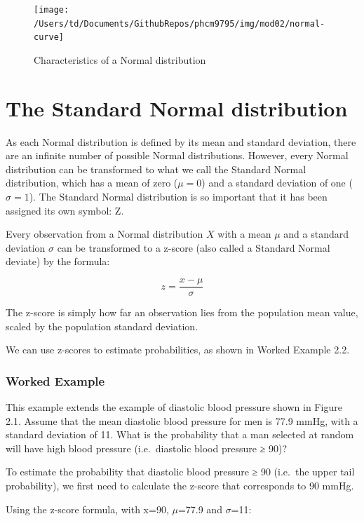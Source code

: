 \documentclass[
]{memoir}
\begin{document}
\begin{figure}
\texttt{[image: /Users/td/Documents/GithubRepos/phcm9795/img/mod02/normal-curve]} \caption{Characteristics of a Normal distribution}\label{fig:fig-2-3}
\end{figure}

\hypertarget{the-standard-normal-distribution}{%
\section{The Standard Normal distribution}\label{the-standard-normal-distribution}}

As each Normal distribution is defined by its mean and standard deviation, there are an infinite number of possible Normal distributions. However, every Normal distribution can be transformed to what we call the Standard Normal distribution, which has a mean of zero (\(\mu = 0\)) and a standard deviation of one (\(\sigma = 1\)). The Standard Normal distribution is so important that it has been assigned its own symbol: Z.

Every observation from a Normal distribution \(X\) with a mean \(\mu\) and a standard deviation \(\sigma\) can be transformed to a z-score (also called a Standard Normal deviate) by the formula:

\[ z = \frac{x - \mu}{\sigma} \]

The z-score is simply how far an observation lies from the population mean value, scaled by the population standard deviation.

We can use z-scores to estimate probabilities, as shown in Worked Example 2.2.

\hypertarget{worked-example-3}{%
\subsubsection{Worked Example}\label{worked-example-3}}

This example extends the example of diastolic blood pressure shown in Figure 2.1. Assume that the mean diastolic blood pressure for men is 77.9 mmHg, with a standard deviation of 11. What is the probability that a man selected at random will have high blood pressure (i.e.~diastolic blood pressure ≥ 90)?

To estimate the probability that diastolic blood pressure ≥ 90 (i.e.~the upper tail probability), we first need to calculate the z-score that corresponds to 90 mmHg.

Using the z-score formula, with x=90, \(\mu\)=77.9 and \(\sigma\)=11:
\end{document}
